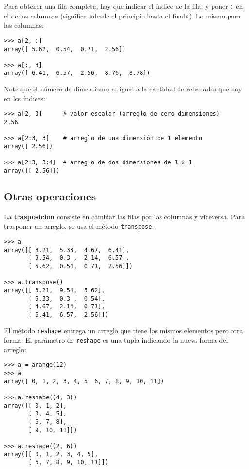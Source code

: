 Para obtener una fila completa, hay que indicar el índice de la fila, y
poner \lstinline!:! en el de las columnas (significa «desde el principio
hasta el final»). Lo mismo para las columnas:

\begin{lstlisting}
>>> a[2, :]
array([ 5.62,  0.54,  0.71,  2.56])

>>> a[:, 3]
array([ 6.41,  6.57,  2.56,  8.76,  8.78])
\end{lstlisting}

Note que el número de dimensiones es igual a la cantidad de rebanados
que hay en los índices:

\begin{lstlisting}
>>> a[2, 3]      # valor escalar (arreglo de cero dimensiones)
2.56

>>> a[2:3, 3]    # arreglo de una dimensión de 1 elemento
array([ 2.56])

>>> a[2:3, 3:4]  # arreglo de dos dimensiones de 1 x 1
array([[ 2.56]])
\end{lstlisting}

\subsection{Otras operaciones}

La \textbf{trasposicion} consiste en cambiar las filas por las columnas
y viceversa. Para trasponer un arreglo, se usa el método
\lstinline!transpose!:

\begin{lstlisting}
>>> a
array([[ 3.21,  5.33,  4.67,  6.41],
       [ 9.54,  0.3 ,  2.14,  6.57],
       [ 5.62,  0.54,  0.71,  2.56]])

>>> a.transpose()
array([[ 3.21,  9.54,  5.62],
       [ 5.33,  0.3 ,  0.54],
       [ 4.67,  2.14,  0.71],
       [ 6.41,  6.57,  2.56]])
\end{lstlisting}

El método \lstinline!reshape! entrega un arreglo que tiene los mismos
elementos pero otra forma. El parámetro de \lstinline!reshape! es una
tupla indicando la nueva forma del arreglo:

\begin{lstlisting}
>>> a = arange(12)
>>> a
array([ 0, 1, 2, 3, 4, 5, 6, 7, 8, 9, 10, 11])

>>> a.reshape((4, 3))
array([[ 0, 1, 2],
       [ 3, 4, 5],
       [ 6, 7, 8],
       [ 9, 10, 11]])

>>> a.reshape((2, 6))
array([[ 0, 1, 2, 3, 4, 5],
       [ 6, 7, 8, 9, 10, 11]])
\end{lstlisting}

